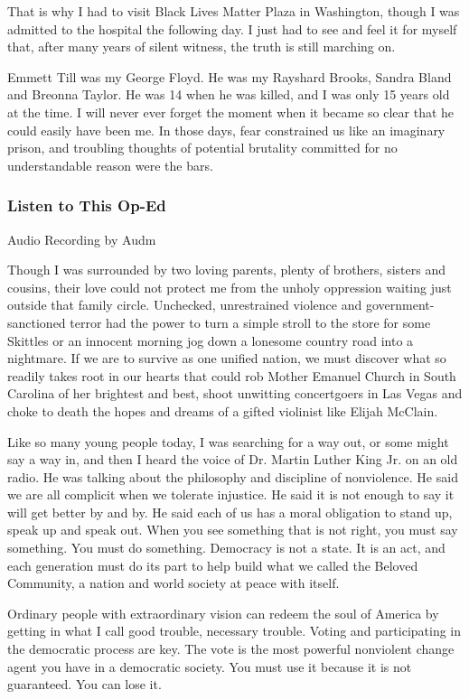 That is why I had to visit Black Lives Matter Plaza in Washington,
though I was admitted to the hospital the following day. I just had to
see and feel it for myself that, after many years of silent witness, the
truth is still marching on.

Emmett Till was my George Floyd. He was my Rayshard Brooks, Sandra Bland
and Breonna Taylor. He was 14 when he was killed, and I was only 15
years old at the time. I will never ever forget the moment when it
became so clear that he could easily have been me. In those days, fear
constrained us like an imaginary prison, and troubling thoughts of
potential brutality committed for no understandable reason were the
bars.

\hypertarget{listen-to-this-op-ed}{%
\subsubsection{Listen to This Op-Ed}\label{listen-to-this-op-ed}}

Audio Recording by Audm

Though I was surrounded by two loving parents, plenty of brothers,
sisters and cousins, their love could not protect me from the unholy
oppression waiting just outside that family circle. Unchecked,
unrestrained violence and government-sanctioned terror had the power to
turn a simple stroll to the store for some Skittles or an innocent
morning jog down a lonesome country road into a nightmare. If we are to
survive as one unified nation, we must discover what so readily takes
root in our hearts that could rob Mother Emanuel Church in South
Carolina of her brightest and best, shoot unwitting concertgoers in Las
Vegas and choke to death the hopes and dreams of a gifted violinist like
Elijah McClain.

Like so many young people today, I was searching for a way out, or some
might say a way in, and then I heard the voice of Dr. Martin Luther King
Jr. on an old radio. He was talking about the philosophy and discipline
of nonviolence. He said we are all complicit when we tolerate injustice.
He said it is not enough to say it will get better by and by. He said
each of us has a moral obligation to stand up, speak up and speak out.
When you see something that is not right, you must say something. You
must do something. Democracy is not a state. It is an act, and each
generation must do its part to help build what we called the Beloved
Community, a nation and world society at peace with itself.

Ordinary people with extraordinary vision can redeem the soul of America
by getting in what I call good trouble, necessary trouble. Voting and
participating in the democratic process are key. The vote is the most
powerful nonviolent change agent you have in a democratic society. You
must use it because it is not guaranteed. You can lose it.

